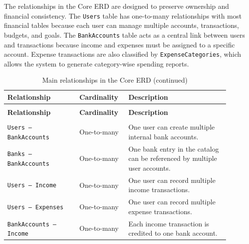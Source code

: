﻿\documentclass{article}
\begin{document}
The relationships in the Core ERD are designed to preserve ownership and financial consistency.
The \texttt{Users} table has one-to-many relationships with most financial tables because each
user can manage multiple accounts, transactions, budgets, and goals. The \texttt{BankAccounts}
table acts as a central link between users and transactions because income and expenses must be
assigned to a specific account. Expense transactions are also classified by \texttt{ExpenseCategories},
which allows the system to generate category-wise spending reports.

\small
\renewcommand{\arraystretch}{1.2}

\begin{longtable}{
    >{\raggedright\arraybackslash}p{0.30\linewidth}
    >{\centering\arraybackslash}p{0.18\linewidth}
    J{0.42\linewidth}
}
\caption{Main relationships in the Core ERD}
\label{tab:core-relationships} \\

\toprule
\textbf{Relationship} & \textbf{Cardinality} & \textbf{Description} \\
\midrule
\endfirsthead

\caption[]{Main relationships in the Core ERD (continued)} \\

\toprule
\textbf{Relationship} & \textbf{Cardinality} & \textbf{Description} \\
\midrule
\endhead

\midrule
{} \\
\endfoot

\bottomrule
\endlastfoot

\texttt{Users -- BankAccounts}
    & One-to-many
    & One user can create multiple internal bank accounts. \\

\texttt{Banks -- BankAccounts}
    & One-to-many
    & One bank entry in the catalog can be referenced by multiple user accounts. \\

\texttt{Users -- Income}
    & One-to-many
    & One user can record multiple income transactions. \\

\texttt{Users -- Expenses}
    & One-to-many
    & One user can record multiple expense transactions. \\

\texttt{BankAccounts -- Income}
    & One-to-many
    & Each income transaction is credited to one bank account. \\


\end{longtable}
\end{document}
